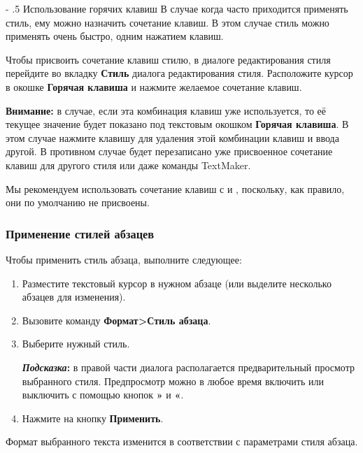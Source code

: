 ﻿\documentclass[a4paper,10pt]{article}
\makeatletter
\renewcommand\paragraph{%
   \@startsection{paragraph}{4}{0mm}%
      {-\baselineskip}%
      {.5\baselineskip}%
      {\normalfont\normalsize\bfseries}}
\makeatother
\begin{document}
\paragraph{Использование горячих клавиш}
В случае когда часто приходится применять стиль, ему можно назначить сочетание клавиш. В этом случае стиль можно применять очень быстро, одним нажатием клавиш.

Чтобы присвоить сочетание клавиш стилю, в диалоге редактирования стиля перейдите во вкладку \textbf{Стиль} диалога редактирования стиля. Расположите курсор в окошке \textbf{Горячая клавиша} и нажмите желаемое сочетание клавиш.

\begin{mdframed}[backgroundcolor=blue!10]
\textbf{Внимание:} в случае, если эта комбинация клавиш уже используется, то её текущее значение будет показано под текстовым окошком \textbf{Горячая клавиша}. В этом случае нажмите клавишу  для удаления этой комбинации клавиш и ввода другой. В противном случае будет перезаписано уже присвоенное сочетание клавиш для другого стиля или даже команды TextMaker.
\end{mdframed}

Мы рекомендуем использовать сочетание клавиш с  и , поскольку, как правило, они по умолчанию не присвоены.

\subsubsection{Применение стилей абзацев}

Чтобы применить стиль абзаца, выполните следующее:
\begin{enumerate}
 \item Разместите текстовый курсор в нужном абзаце (или выделите несколько абзацев для изменения).
 \item Вызовите команду \textbf{Формат>Стиль абзаца}.
 \item Выберите нужный стиль.
 \begin{mdframed}[backgroundcolor=blue!10]
\textbf{\textit{Подсказка}:} в правой части диалога располагается предварительный просмотр выбранного стиля. Предпросмотр можно в любое время включить или выключить с помощью кнопок \textbf{»} и \textbf{«}.
\end{mdframed}
\item Нажмите на кнопку \textbf{Применить}.
\end{enumerate}

Формат выбранного текста изменится в соответствии с параметрами стиля абзаца.
\end{document}
